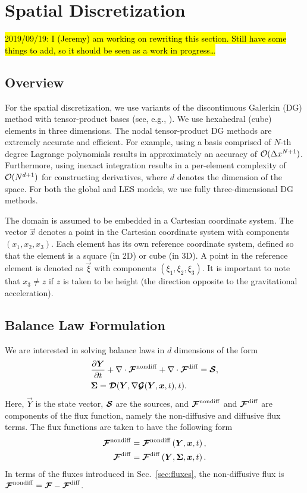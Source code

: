 \documentclass{report}
\begin{document}
{\section{Spatial Discretization}

\hl{2019/09/19: I (Jeremy) am working on rewriting this section. Still have some
things to add, so it should be seen as a work in progress\dots}

\subsection{Overview}
For the spatial discretization, we use variants of the discontinuous Galerkin
(DG) method with tensor-product bases (see, e.g., \citealt{giraldo:2008a,
abdi:2016}). We use hexahedral (cube) elements in three dimensions.  The nodal
tensor-product DG methods are extremely accurate and efficient.  For example,
using a basis comprised of $N$-th degree Lagrange polynomials results in
approximately an accuracy of $\mathcal{O}(\Delta x^{N+1})$. Furthermore, using
inexact integration results in a per-element complexity of $\mathcal{O}(N^{d+1})$ for
constructing derivatives, where $d$ denotes the dimension of the space. For both
the global and LES models, we use fully three-dimensional DG methods.

The domain is assumed to be embedded in a Cartesian
coordinate system. The vector $\vec{x}$ denotes a point in the Cartesian
coordinate system with components $(x_{1}, x_{2},
x_{3})$. Each element has its own reference coordinate system, defined
so that the element is a square (in 2D) or cube (in
3D). A point in the reference element is denoted as $\vec{\xi}$ with components
$(\xi_{1}, \xi_{2}, \xi_{3})$.  It is important to note that $x_{3} \ne z$ if
$z$ is taken to be height (the direction opposite to the gravitational
acceleration).

\subsection{Balance Law Formulation}
We are interested in solving balance laws in $d$ dimensions of the form
\begin{align}
  &\frac{\partial \boldsymbol{{Y}}}{\partial t} + \nabla \cdot \boldsymbol{{\mathcal{F}}}^{\mathrm{nondiff}} + \nabla \cdot \boldsymbol{{\mathcal{F}}}^{\mathrm{diff}}
  =
  \boldsymbol{{\mathcal{S}}},\\
  &\boldsymbol{{\Sigma}} = \boldsymbol{{\mathcal{D}}}(\boldsymbol{{Y}}, \nabla \boldsymbol{{\mathcal{G}}}(\boldsymbol{{Y}}, \boldsymbol{{x}}, t), t).
\end{align}
Here, $\vec{Y}$ is the state vector, $\boldsymbol{{\mathcal{S}}}$ are the sources, and
$\boldsymbol{{\mathcal{F}}}^{\mathrm{nondiff}}$ and $\boldsymbol{{\mathcal{F}}}^{\mathrm{diff}}$ are components of the flux function, namely the
non-diffusive and diffusive flux terms. The flux functions are taken to have the
following form
\begin{align}
  \boldsymbol{{\mathcal{F}}}^{\mathrm{nondiff}} &= \boldsymbol{{\mathcal{F}}}^{\mathrm{nondiff}}\left(\boldsymbol{{Y}}, \boldsymbol{{x}}, t\right),\\
  \boldsymbol{{\mathcal{F}}}^{\mathrm{diff}} &= \boldsymbol{{\mathcal{F}}}^{\mathrm{diff}}\left(\boldsymbol{{Y}}, \boldsymbol{{\Sigma}}, \boldsymbol{{x}}, t\right).
\end{align}
In terms of the fluxes introduced in Sec.~\ref{sec:fluxes}, the non-diffusive
flux is $\boldsymbol{{\mathcal{F}}}^{\mathrm{nondiff}} = \boldsymbol{{\mathcal{F}}} - \boldsymbol{{\mathcal{F}}}^{\mathrm{diff}}$.

}
\end{document}
